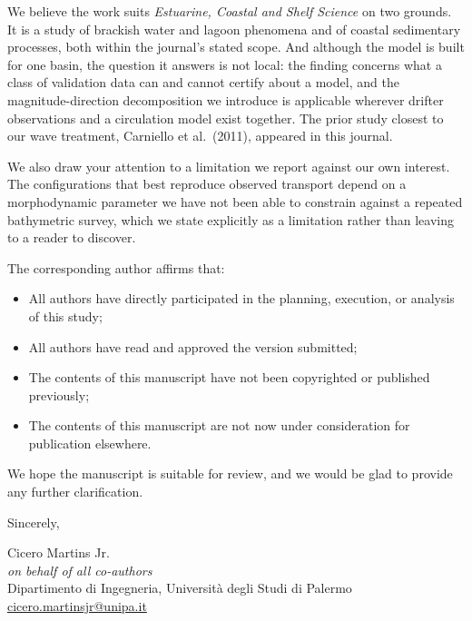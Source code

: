 \documentclass[11pt]{article}
\begin{document}
We believe the work suits \textit{Estuarine, Coastal and Shelf Science} on two
grounds. It is a study of brackish water and lagoon phenomena and of coastal
sedimentary processes, both within the journal's stated scope. And although the
model is built for one basin, the question it answers is not local: the finding
concerns what a class of validation data can and cannot certify about a model,
and the magnitude-direction decomposition we introduce is applicable wherever
drifter observations and a circulation model exist together. The prior study
closest to our wave treatment, Carniello et al.\ (2011), appeared in this
journal.

We also draw your attention to a limitation we report against our own interest.
The configurations that best reproduce observed transport depend on a
morphodynamic parameter we have not been able to constrain against a repeated
bathymetric survey, which we state
explicitly as a limitation rather than leaving to a reader to discover.

\vspace{0.3cm}
The corresponding author affirms that:

\begin{itemize}[noitemsep, leftmargin=1.2em]
\item{All authors have directly participated in the planning, execution, or analysis of this study;}
\item{All authors have read and approved the version submitted;}
\item{The contents of this manuscript have not been copyrighted or published previously;}
\item{The contents of this manuscript are not now under consideration for publication elsewhere.}
\end{itemize}

\vspace{0.3cm}

We hope the manuscript is suitable for review, and we would be glad to provide
any further clarification.

\vspace{0.5cm}
Sincerely,

\vspace{0.3cm}
Cicero Martins Jr.\\
\textit{on behalf of all co-authors}\\
Dipartimento di Ingegneria, Universit\`a degli Studi di Palermo\\
\href{mailto:cicero.martinsjr@unipa.it}{cicero.martinsjr@unipa.it}
\end{document}
